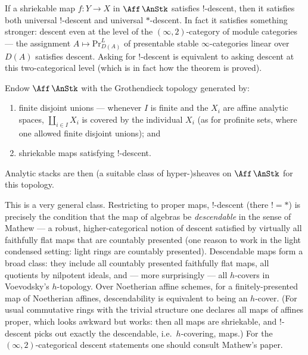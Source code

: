 \begin{theorem}
\label{thm:16:descent}
If a shriekable map $f\colon Y\to X$ in $\Aff\,\AnStk$ satisfies $!$-descent, then it
satisfies both universal $!$-descent and universal $*$-descent. In fact it satisfies
something stronger: descent even at the level of the $(\infty,2)$-category of module
categories --- the assignment $A\mapsto\mathrm{Pr}^L_{D(A)}$ of presentable stable
$\infty$-categories linear over $D(A)$ satisfies descent. Asking for $!$-descent is
equivalent to asking descent at this two-categorical level (which is in fact how the
theorem is proved).
\end{theorem}

\begin{definition}
\label{def:16:topology}
Endow $\Aff\,\AnStk$ with the Grothendieck topology generated by:
\begin{enumerate}
\item finite disjoint unions --- whenever $I$ is finite and the $X_i$ are affine analytic
spaces, $\coprod_{i\in I}X_i$ is covered by the individual $X_i$ (as for profinite sets,
where one allowed finite disjoint unions); and
\item shriekable maps satisfying $!$-descent.
\end{enumerate}
Analytic stacks are then (a suitable class of hyper-)sheaves on $\Aff\,\AnStk$ for this
topology.
\end{definition}

\begin{remark}
\label{rmk:16:descendability}
This is a very general class. Restricting to proper maps, $!$-descent (there $!=*$) is
precisely the condition that the map of algebras be \emph{descendable} in the sense of
Mathew \cite{mathew2016galoisgroupstablehomotopy} --- a robust, higher-categorical notion
of descent satisfied by virtually all faithfully flat maps that are countably presented
(one reason to work in the light condensed setting: light rings are countably
presented). Descendable maps form a broad class: they include all countably presented
faithfully flat maps, all quotients by nilpotent ideals, and --- more surprisingly --- all
$h$-covers in Voevodsky's $h$-topology. Over Noetherian affine schemes, for a
finitely-presented map of Noetherian affines, descendability is equivalent to being an
$h$-cover. (For usual commutative rings with the trivial structure one declares all maps
of affines proper, which looks awkward but works: then all maps are shriekable, and
$!$-descent picks out exactly the descendable, i.e.\ $h$-covering, maps.) For the
$(\infty,2)$-categorical descent statements one should consult Mathew's paper.
\end{remark}

